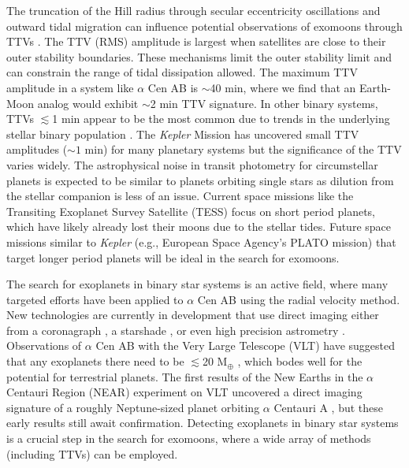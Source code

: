 \documentclass[preprint]{aastex63}
\begin{document}
The truncation of the Hill radius through secular eccentricity oscillations and outward tidal migration can influence potential observations of exomoons through TTVs \citep{Kipping2009a,Kipping2009b}.  The TTV {(RMS)} amplitude is largest when satellites are close to their outer stability boundaries.  These mechanisms limit the outer stability limit and can constrain the range of tidal dissipation allowed.  The maximum TTV amplitude in a system like $\alpha$ Cen AB is $\sim$40 min, where we find that an Earth-Moon analog would exhibit $\sim$2 min TTV signature.  In other binary systems, TTVs $\lesssim$1 min appear to be the most common due to trends in the underlying stellar binary population \citep{Raghavan2010,Moe2017}. {The \textit{Kepler} Mission has uncovered small TTV amplitudes ($\sim 1$ min) for many planetary systems but the significance of the TTV varies widely.  The astrophysical noise in transit photometry for circumstellar planets is expected to be similar to planets orbiting single stars as dilution from the stellar companion is less of an issue.  Current space missions like the Transiting Exoplanet Survey Satellite (TESS) focus on short period planets, which have likely already lost their moons due to the stellar tides.  Future space missions similar to \textit{Kepler} (e.g., European Space Agency's PLATO mission) that target longer period planets will be ideal in the search for exomoons.}

The search for exoplanets in binary star systems is an active field, where many targeted efforts have been applied to $\alpha$ Cen AB \citep{Endl2001,Endl2015,Bergmann2015} using the radial velocity method.  New technologies are currently in development that use direct imaging either from a coronagraph \citep{Belikov2015,Bendek2015,Thomas2015,Sirbu2017b,Belikov2017,Beichman2020}, a starshade \citep{Sirbu2017a,Bellotti2020}, or even high precision astrometry \citep{Bendek2018}.  Observations of $\alpha$ Cen AB with the Very Large Telescope (VLT) have suggested that any exoplanets there need to be $\lesssim$20 M$_\oplus$ \citep{Kasper2019}, which bodes well for the potential for terrestrial planets.  The first results of the New Earths in the $\alpha$ Centauri Region (NEAR) experiment on VLT uncovered a direct imaging signature of a roughly Neptune-sized planet orbiting $\alpha$ Centauri A \citep{Wagner2021}, but these early results still await confirmation.  Detecting exoplanets in binary star systems is a crucial step in the search for exomoons, where a wide array of methods (including TTVs) can be employed.
\end{document}
